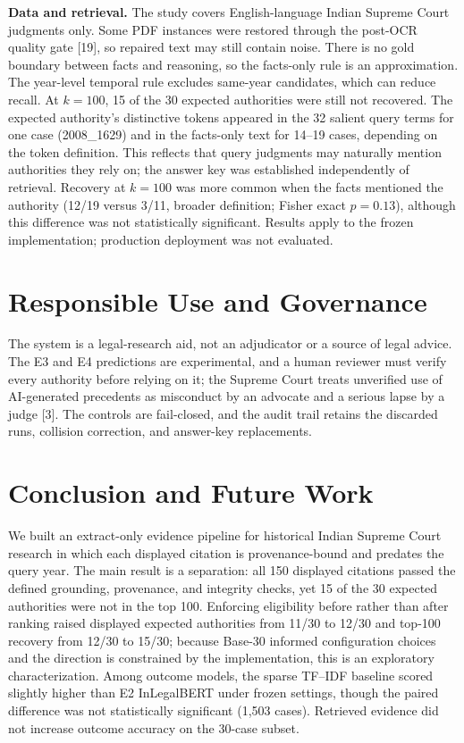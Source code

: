 \documentclass[conference]{IEEEtran}
\begin{document}
\textbf{Data and retrieval.} The study covers English-language Indian Supreme Court judgments only. Some PDF instances were restored through the post-OCR quality gate [19], so repaired text may still contain noise. There is no gold boundary between facts and reasoning, so the facts-only rule is an approximation. The year-level temporal rule excludes same-year candidates, which can reduce recall. At $k=100$, 15 of the 30 expected authorities were still not recovered. The expected authority's distinctive tokens appeared in the 32 salient query terms for one case (2008\_1629) and in the facts-only text for 14--19 cases, depending on the token definition. This reflects that query judgments may naturally mention authorities they rely on; the answer key was established independently of retrieval. Recovery at $k=100$ was more common when the facts mentioned the authority (12/19 versus 3/11, broader definition; Fisher exact $p = 0.13$), although this difference was not statistically significant. Results apply to the frozen implementation; production deployment was not evaluated.

\section{Responsible Use and Governance}
The system is a legal-research aid, not an adjudicator or a source of legal advice. The E3 and E4 predictions are experimental, and a human reviewer must verify every authority before relying on it; the Supreme Court treats unverified use of AI-generated precedents as misconduct by an advocate and a serious lapse by a judge [3]. The controls are fail-closed, and the audit trail retains the discarded runs, collision correction, and answer-key replacements.

\section{Conclusion and Future Work}
We built an extract-only evidence pipeline for historical Indian Supreme Court research in which each displayed citation is provenance-bound and predates the query year. The main result is a separation: all 150 displayed citations passed the defined grounding, provenance, and integrity checks, yet 15 of the 30 expected authorities were not in the top 100. Enforcing eligibility before rather than after ranking raised displayed expected authorities from 11/30 to 12/30 and top-100 recovery from 12/30 to 15/30; because Base-30 informed configuration choices and the direction is constrained by the implementation, this is an exploratory characterization. Among outcome models, the sparse TF--IDF baseline scored slightly higher than E2 InLegalBERT under frozen settings, though the paired difference was not statistically significant (1,503 cases). Retrieved evidence did not increase outcome accuracy on the 30-case subset.
\end{document}
